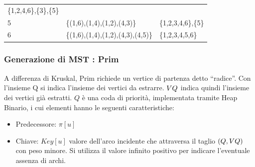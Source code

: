 \documentclass{article}
\providecommand{\tightlist}{%
  \setlength{\itemsep}{0pt}\setlength{\parskip}{0pt}}
\begin{document}
\begin{longtable}[]{@{}lll@{}}
\begin{minipage}[t]{0.30\columnwidth}
{\{1,2,4,6\},\{3\},\{5\}}\strut
\end{minipage}\tabularnewline
\begin{minipage}[t]{0.30\columnwidth}\raggedright\strut
{5}\strut
\end{minipage} & \begin{minipage}[t]{0.30\columnwidth}\raggedright\strut
{\{(1,6),(1,4),(1,2),(4,3)\}}\strut
\end{minipage} & \begin{minipage}[t]{0.30\columnwidth}\raggedright\strut
{\{1,2,3,4,6\},\{5\}}\strut
\end{minipage}\tabularnewline
\begin{minipage}[t]{0.30\columnwidth}\raggedright\strut
{6}\strut
\end{minipage} & \begin{minipage}[t]{0.30\columnwidth}\raggedright\strut
{\{(1,6),(1,4),(1,2),(4,3),(4,5)\}}\strut
\end{minipage} & \begin{minipage}[t]{0.30\columnwidth}\raggedright\strut
{\{1,2,3,4,5,6\}}\strut
\end{minipage}\tabularnewline
\bottomrule
\end{longtable}

\hypertarget{h.l5wypo8krmqc}{\subsubsection{\texorpdfstring{{Generazione di MST : Prim}}{Generazione di MST : Prim}}\label{h.l5wypo8krmqc}}

{A differenza di Kruskal, Prim richiede un vertice di partenza detto ``radice''. Con l'insieme Q si indica l'insieme dei vertici da estrarre.
$V\\Q$ indica quindi l'insieme dei vertici già estratti. $Q$ è una coda di priorità, implementata tramite Heap Binario, i cui elementi hanno le seguenti caratteristiche:}

\begin{itemize}
\tightlist
\item
  Predecessore: $\pi[u]$
\item
Chiave: $Key[u]$ valore dell'arco incidente che attraversa il taglio $(Q,V\\Q)$ con peso minore. Si utilizza il valore infinito positivo per indicare l'eventuale assenza di archi.
\end{itemize}

\protect\hypertarget{t.8fdb0455858db4c6dd05987cee7bc92788c770bd}{}{}\protect\hypertarget{t.44}{}{}
\end{document}
